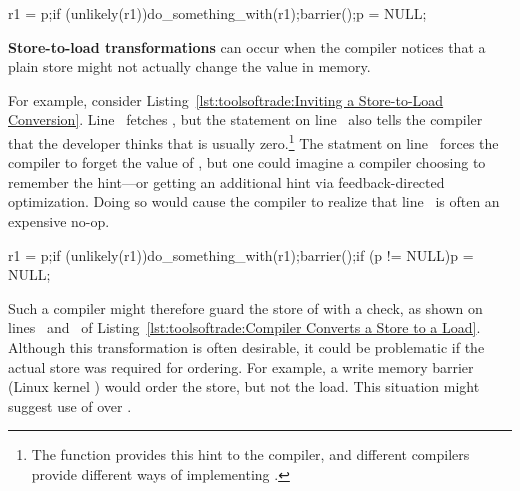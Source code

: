 \begin{listing}[tbp]
\begin{fcvlabel}
\begin{VerbatimL}[commandchars=\\\[\]]
r1 = p;\lnlbl[load:p]
if (unlikely(r1))\lnlbl[if]
	do_something_with(r1);\lnlbl[dsw]
barrier();\lnlbl[barrier]
p = NULL;\lnlbl[null]
\end{VerbatimL}
\end{fcvlabel}
\caption{Inviting a Store-to-Load Conversion}
\label{lst:toolsoftrade:Inviting a Store-to-Load Conversion}
\end{listing}

{\bf Store-to-load transformations} can occur when the compiler notices
that a plain store might not actually change the value in memory.
\begin{fcvref}
For example, consider
Listing~\ref{lst:toolsoftrade:Inviting a Store-to-Load Conversion}.
Line~ fetches , but the  statement on
line~ also tells the compiler that the developer thinks that
 is usually zero.\footnote{
	The  function provides this hint to the compiler,
	and different compilers provide different ways of implementing
	.}
The  statment on line~ forces the compiler
to forget the value of , but one could imagine a compiler
choosing to remember the hint---or getting an additional hint via
feedback-directed optimization.
Doing so would cause the compiler to realize that line~
is often an expensive no-op.
\end{fcvref}

\begin{listing}[tbp]
\begin{fcvlabel}
\begin{VerbatimL}[commandchars=\\\[\]]
r1 = p;\lnlbl[load:p]
if (unlikely(r1))\lnlbl[if]
	do_something_with(r1);\lnlbl[dsw]
barrier();\lnlbl[barrier]
if (p != NULL)\lnlbl[if1]
	p = NULL;\lnlbl[null]
\end{VerbatimL}
\end{fcvlabel}
\caption{Compiler Converts a Store to a Load}
\label{lst:toolsoftrade:Compiler Converts a Store to a Load}
\end{listing}

\begin{fcvref}
Such a compiler might therefore guard the store of 
with a check, as shown on lines~ and~ of
Listing~\ref{lst:toolsoftrade:Compiler Converts a Store to a Load}.
Although this transformation is often desirable, it could be problematic
if the actual store was required for ordering.
For example, a write memory barrier (Linux kernel ) would
order the store, but not the load.
This situation might suggest use of  over
.
\end{fcvref}

